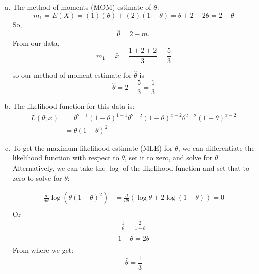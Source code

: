 \documentclass[12pt]{article}
\begin{document}
 \begin{enumerate}[(a)] %
\item The method of moments (MOM) estimate of $\theta$: 
\begin{equation*}
m_1 = E(X) = (1)(\theta) + (2)(1 - \theta) = \theta + 2 - 2\theta = 2 - \theta
\end{equation*}
So,
\begin{equation*}
\hat{\theta} = 2 - m_1
\end{equation*}
From our data, 
\begin{equation*}
m_1 = \bar{x} = \frac{1 + 2 + 2}{3} = \frac{5}{3}
\end{equation*}

so our method of moment estimate for $\hat{\theta}$ is 
\begin{equation*}
\hat{\theta} = 2 - \frac{5}{3} = \frac{1}{3}
\end{equation*}

\item The likelihood function for this data is:
\begin{align*}
L(\theta; x) &= \theta^{2 - 1} (1 - \theta)^{1 -1} \theta^{2 - 2} (1 - \theta)^{x -2}\theta^{2 - 2} (1 - \theta)^{x -2} \\
&= \theta (1 - \theta)^2
\end{align*}

\item To get the maximum likelihood estimate (MLE) for $\theta$, we can differentiate the likelihood function with respect to $\theta$, set it to zero, and solve for $\theta$. Alternatively, we can take the $\log$ of the likelihood function and set that to zero to solve for $\theta$:

\begin{align*}
\frac{d} {d \theta} \log (\theta (1 - \theta)^2) &= \frac{d} {d \theta} \left(\log \theta + 2 \log(1 - \theta) \right) = 0\\
\end{align*}
Or
\begin{align*}
\frac{1}{\theta} = \frac{2}{1 - \theta}\\
\end{align*}
\begin{align*}
1 - \theta = 2 \theta\\
\end{align*}
From where we get:
$$
\boxed{\hat \theta = \frac{1}{3}}
$$
\end{enumerate}
\end{document}
